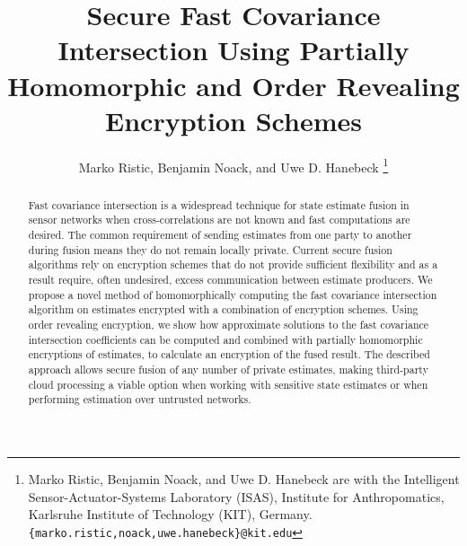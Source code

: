 \documentclass[letterpaper, 10 pt, conference]{ieeeconf}  %
\title{\LARGE \bf
Secure Fast Covariance Intersection Using Partially Homomorphic and Order Revealing Encryption Schemes
}
\author{Marko Ristic, Benjamin Noack, and Uwe D. Hanebeck%
\thanks{Marko Ristic, Benjamin Noack, and Uwe D. Hanebeck are with the Intelligent Sensor-Actuator-Systems Laboratory (ISAS), Institute for Anthropomatics, Karlsruhe Institute of Technology (KIT), Germany.\newline
{\tt\small \{marko.ristic,noack,uwe.hanebeck\}@kit.edu}%
}%
}
\begin{document}
\maketitle
\thispagestyle{empty}
\pagestyle{empty}




\begin{abstract}

Fast covariance intersection is a widespread technique for state estimate fusion in sensor networks when cross-correlations are not known and fast computations are desired. The common requirement of sending estimates from one party to another during fusion means they do not remain locally private. Current secure fusion algorithms rely on encryption schemes that do not provide sufficient flexibility and as a result require, often undesired, excess communication between estimate producers. We propose a novel method of homomorphically computing the fast covariance intersection algorithm on estimates encrypted with a combination of encryption schemes. Using order revealing encryption, we show how approximate solutions to the fast covariance intersection coefficients can be computed and combined with partially homomorphic encryptions of estimates, to calculate an encryption of the fused result. The described approach allows secure fusion of any number of private estimates, making third-party cloud processing a viable option when working with sensitive state estimates or when performing estimation over untrusted networks.

\end{abstract}



\end{document}
